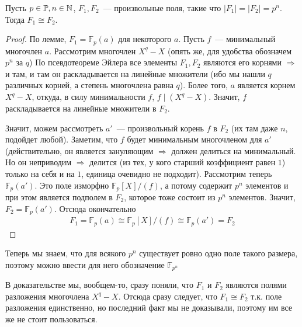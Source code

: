 \begin{theorem}
    Пусть $p\in \mathbb{P}, n\in \mathbb{N}$, $F_1, F_2$~--- произвольные поля, такие что $|F_1|=|F_2|=p^n$.
    Тогда $F_1\cong F_2$.
\end{theorem}
\begin{proof}
    По лемме, $F_1=\mathbb{F}_p(a)$ для некоторого $a$.
    Пусть $f$~--- минимальный многочлен $a$.
    Рассмотрим многочлен $X^q-X$ (опять же, для удобства обозначем $p^n$ за $q$)
    По псевдотеореме Эйлера все элементы $F_1, F_2$ являются его корнями $\Rightarrow$ и там, и там он раскладывается на линейные множители (ибо мы нашли $q$ различных корней, а степень многочлена равна $q$).
    Более того, $a$ является корнем $X^q-X$, откуда, в силу минимальности $f$, $f \mid (X^q-X)$.
    Значит, $f$ раскладывается на линейные множители в $F_2$.

    Значит, можем рассмотреть $a'$~--- произвольный корень $f$ в $F_2$ (их там даже $n$, подойдет любой).
    Заметим, что $f$ будет минимальным многочленом для $a'$ (действительно, он является зануляющим $\Rightarrow$ должен делиться на минимальный. Но он неприводим $\Rightarrow$ делится (из тех, у кого старший коэффициент равен $1$) только на себя и на $1$, единица очевидно не подходит).
    Рассмотрим теперь $\mathbb{F}_p(a')$.
    Это поле изморфно $\mathbb{F}_p[X] / (f)$, а потому содержит $p^n$ элементов и при этом является подполем в $F_2$, которое тоже состоит из $p^n$ элементов.
    Значит, $F_2 = \mathbb{F}_p(a')$.
    Отсюда окончательно
    \begin{gather*}
        F_1 = \mathbb{F}_p(a) \cong \mathbb{F}_p[X] / (f) \cong \mathbb{F}_p(a') = F_2
    \end{gather*}
\end{proof}

\notice Теперь мы знаем, что для всякого $p^n$ существует ровно одно поле такого размера, поэтому можно ввести для него обозначение $\mathbb{F}_{p^n}$

\notice В доказательстве мы, вообщем-то, сразу поняли, что $F_1$ и $F_2$ являются полями разложения многочлена $X^q-X$.
Отсюда сразу следует, что $F_1\cong F_2$ т.к. поле разложения единственно, но последний факт мы не доказывали, поэтому им все же не стоит пользоваться.
